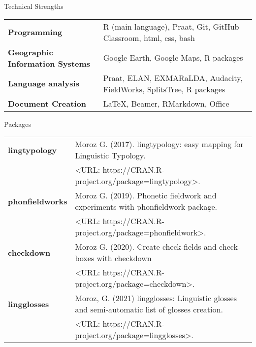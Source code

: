 \documentclass{resume} %
\begin{document}
\begin{rSection}{Technical Strengths}

\begin{tabular}{ @{} >{\bfseries}l @{\hspace{6ex}} l }
Programming & R (main language), Praat, Git, GitHub Classroom, html, css, bash\\
Geographic Information Systems & Google Earth, Google Maps, R packages\\
Language analysis & Praat, ELAN, EXMARaLDA, Audacity, FieldWorks, SplitsTree, R packages\\
Document Creation & \LaTeX, Beamer, RMarkdown, Office\\
\end{tabular}

\end{rSection}

\begin{rSection}{Packages}
\begin{tabular}{ @{} >{\bfseries}l @{\hspace{6ex}} l }
lingtypology  & Moroz G. (2017). lingtypology: easy mapping for Linguistic Typology. \\
& <URL: https://CRAN.R-project.org/package=lingtypology>.\\
phonfieldworks & Moroz G. (2019). Phonetic fieldwork and experiments with phonfieldwork
package.\\
& <URL: https://CRAN.R-project.org/package=phonfieldwork>.\\
checkdown & Moroz G. (2020). Create check-fields and check-boxes with checkdown\\
& <URL: https://CRAN.R-project.org/package=checkdown>.\\
lingglosses & Moroz, G. (2021) lingglosses: Linguistic glosses and semi-automatic list of glosses creation.\\
& <URL: https://CRAN.R-project.org/package=lingglosses>.\\
\end{tabular}

\end{rSection}
\end{document}
